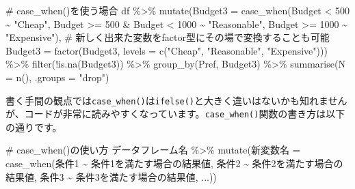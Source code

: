 \documentclass[
  a4paper,
  pandoc,
  ja=standard,
  jafont=haranoaji]{bxjsbook}
\newenvironment{Shaded}{\begin{snugshade}}{\end{snugshade}}
\newcommand{\AttributeTok}[1]{\textcolor[rgb]{0.00,0.48,0.65}{#1}}
\newcommand{\CommentTok}[1]{\textcolor[rgb]{0.37,0.37,0.37}{#1}}
\newcommand{\DecValTok}[1]{\textcolor[rgb]{0.68,0.00,0.00}{#1}}
\newcommand{\FunctionTok}[1]{\textcolor[rgb]{0.28,0.35,0.67}{#1}}
\newcommand{\NormalTok}[1]{\textcolor[rgb]{0.00,0.48,0.65}{#1}}
\newcommand{\OtherTok}[1]{\textcolor[rgb]{0.00,0.48,0.65}{#1}}
\newcommand{\SpecialCharTok}[1]{\textcolor[rgb]{0.37,0.37,0.37}{#1}}
\newcommand{\StringTok}[1]{\textcolor[rgb]{0.13,0.47,0.30}{#1}}
\begin{document}
\begin{Shaded}
\begin{Highlighting}[numbers=left,,]
\CommentTok{\# case\_when()を使う場合}
\NormalTok{df }\SpecialCharTok{\%\textgreater{}\%} 
  \FunctionTok{mutate}\NormalTok{(}\AttributeTok{Budget3 =} \FunctionTok{case\_when}\NormalTok{(Budget }\SpecialCharTok{\textless{}} \DecValTok{500}                  \SpecialCharTok{\textasciitilde{}} \StringTok{"Cheap"}\NormalTok{,}
\NormalTok{                             Budget }\SpecialCharTok{\textgreater{}=} \DecValTok{500} \SpecialCharTok{\&}\NormalTok{ Budget }\SpecialCharTok{\textless{}} \DecValTok{1000} \SpecialCharTok{\textasciitilde{}} \StringTok{"Reasonable"}\NormalTok{,}
\NormalTok{                             Budget }\SpecialCharTok{\textgreater{}=} \DecValTok{1000}                \SpecialCharTok{\textasciitilde{}} \StringTok{"Expensive"}\NormalTok{),}
         \CommentTok{\# 新しく出来た変数をfactor型にその場で変換することも可能}
         \AttributeTok{Budget3 =} \FunctionTok{factor}\NormalTok{(Budget3, }
                          \AttributeTok{levels =} \FunctionTok{c}\NormalTok{(}\StringTok{"Cheap"}\NormalTok{, }\StringTok{"Reasonable"}\NormalTok{, }\StringTok{"Expensive"}\NormalTok{))) }\SpecialCharTok{\%\textgreater{}\%}
  \FunctionTok{filter}\NormalTok{(}\SpecialCharTok{!}\FunctionTok{is.na}\NormalTok{(Budget3)) }\SpecialCharTok{\%\textgreater{}\%}
  \FunctionTok{group\_by}\NormalTok{(Pref, Budget3) }\SpecialCharTok{\%\textgreater{}\%}
  \FunctionTok{summarise}\NormalTok{(}\AttributeTok{N =} \FunctionTok{n}\NormalTok{(),         }
            \AttributeTok{.groups =} \StringTok{"drop"}\NormalTok{)}
\end{Highlighting}
\end{Shaded}

書く手間の観点では\texttt{case\_when()}は\texttt{ifelse()}と大きく違いはないかも知れませんが、コードが非常に読みやすくなっています。\texttt{case\_when()}関数の書き方は以下の通りです。

\begin{Shaded}
\begin{Highlighting}[numbers=left,,]
\CommentTok{\# case\_when()の使い方}
\NormalTok{データフレーム名 }\SpecialCharTok{\%\textgreater{}\%}
  \FunctionTok{mutate}\NormalTok{(新変数名 }\OtherTok{=} \FunctionTok{case\_when}\NormalTok{(条件1 }\SpecialCharTok{\textasciitilde{}}\NormalTok{ 条件1を満たす場合の結果値, }
\NormalTok{                             条件2 }\SpecialCharTok{\textasciitilde{}}\NormalTok{ 条件2を満たす場合の結果値, }
\NormalTok{                             条件3 }\SpecialCharTok{\textasciitilde{}}\NormalTok{ 条件3を満たす場合の結果値, }
\NormalTok{                             ...))}
\end{Highlighting}
\end{Shaded}
\end{document}
